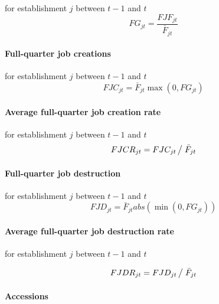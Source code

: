 for establishment $j$ between $t-1$ and $t$%
\begin{equation}
FG_{jt}=\frac{FJF_{jt}}{\bar{F}_{jt}}  \label{eq:FGjt}
\end{equation}

\paragraph{Full-quarter job creations}

for establishment $j$ between $t-1$ and $t$%
\begin{equation}
FJC_{jt}=\bar{F}_{jt}\max \left( 0,FG_{jt}\right)  \label{eq:FJCjt}
\end{equation}

\paragraph{Average full-quarter job creation rate}

for establishment $j$ between $t-1$ and $t$%
\begin{equation}
FJCR_{jt}={FJC_{jt}}\left/ {\vphantom {{FJC_{jt} } {\bar {F}_{jt} }}}
\right. {\bar {F}_{jt} }
\end{equation}

\paragraph{Full-quarter job destruction}

for establishment $j$ between $t-1$ and $t$%
\begin{equation}
FJD_{jt}=\bar{F}_{jt}abs\left( {\min \left( {0,FG_{jt}}\right) }\right)
\end{equation}

\paragraph{Average full-quarter job destruction rate}

for establishment $j$ between $t-1$ and $t$

\begin{equation}
FJDR_{jt} = F{JD_{jt} } \left/ {\vphantom {{JD_{jt} } {\bar {F}_{jt} }}}
\right. {\bar {F}_{jt} }
\end{equation}

\paragraph{Accessions}

